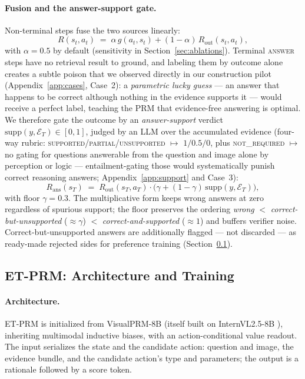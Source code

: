 \documentclass[letterpaper,twocolumn,10pt]{article}
\newcommand{\prm}{ET-PRM}
\begin{document}
\paragraph{Fusion and the answer-support gate.}
Non-terminal steps fuse the two sources linearly:
\begin{equation}
R(s_t, a_t) \;=\; \alpha\, g(a_t, s_t) + (1-\alpha)\, R_\mathrm{out}(s_t, a_t),
\label{eq:fusion}
\end{equation}
with $\alpha = 0.5$ by default (sensitivity in
Section~\ref{sec:ablations}). Terminal \textsc{answer} steps have no
retrieval result to ground, and labeling them by outcome alone creates a
subtle poison that we observed directly in our construction pilot
(Appendix~\ref{app:cases}, Case~2): a \emph{parametric lucky guess} --- an
answer that happens to be correct although nothing in the evidence
supports it --- would receive a perfect label, teaching the PRM that
evidence-free answering is optimal. We therefore gate the outcome by an
\emph{answer-support} verdict $\mathrm{supp}(y, \mathcal{E}_T) \in [0,1]$,
judged by an LLM over the accumulated evidence (four-way rubric:
\textsc{supported}/\textsc{partial}/\textsc{unsupported} $\mapsto$
$1/0.5/0$, plus \textsc{not\_required} $\mapsto$ no gating for questions
answerable from the question and image alone by perception or logic ---
entailment-gating those would systematically punish correct reasoning
answers; Appendix~\ref{app:support} and Case~3):
\begin{equation}
R_\mathrm{ans}(s_T) \;=\; R_\mathrm{out}(s_T, a_T)\cdot
\big( \gamma + (1-\gamma)\,\mathrm{supp}(y, \mathcal{E}_T) \big),
\label{eq:support}
\end{equation}
with floor $\gamma = 0.3$. The multiplicative form keeps wrong answers at
zero regardless of spurious support; the floor preserves the ordering
\emph{wrong} $<$ \emph{correct-but-unsupported} ($\approx\gamma$) $<$
\emph{correct-and-supported} ($\approx 1$) and buffers verifier noise.
Correct-but-unsupported answers are additionally flagged --- not discarded
--- as ready-made rejected sides for preference training
(Section~\ref{sec:training}).

\subsection{\prm{}: Architecture and Training}
\label{sec:training}

\paragraph{Architecture.}
\prm{} is initialized from VisualPRM-8B \cite{visualprm2025} (itself built
on InternVL2.5-8B \cite{chen2024internvl}), inheriting multimodal
inductive biases, with an action-conditional value readout. The input
serializes the state and the candidate action: question and image, the
evidence bundle, and the candidate action's type and parameters; the
output is a rationale followed by a score token.
\end{document}
